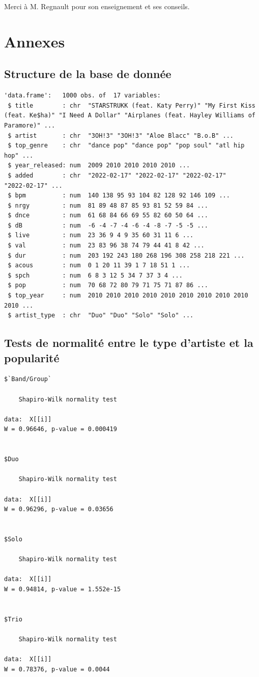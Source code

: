 \documentclass[french,]{compterendu}
\theoremstyle{urcastyle}
\theoremstyle{remark}
\begin{document}
Merci à M. Regnault pour son enseignement et ses conseils.

\hypertarget{appendix-annexes}{%
\appendix}


\hypertarget{annexes}{%
\section{Annexes}\label{annexes}}

\hypertarget{structure-de-la-base-de-donnuxe9e}{%
\subsection{Structure de la base de donnée}\label{structure-de-la-base-de-donnuxe9e}}

\begin{verbatim}
'data.frame':   1000 obs. of  17 variables:
 $ title        : chr  "STARSTRUKK (feat. Katy Perry)" "My First Kiss (feat. Ke$ha)" "I Need A Dollar" "Airplanes (feat. Hayley Williams of Paramore)" ...
 $ artist       : chr  "3OH!3" "3OH!3" "Aloe Blacc" "B.o.B" ...
 $ top_genre    : chr  "dance pop" "dance pop" "pop soul" "atl hip hop" ...
 $ year_released: num  2009 2010 2010 2010 2010 ...
 $ added        : chr  "2022‑02‑17" "2022‑02‑17" "2022‑02‑17" "2022‑02‑17" ...
 $ bpm          : num  140 138 95 93 104 82 128 92 146 109 ...
 $ nrgy         : num  81 89 48 87 85 93 81 52 59 84 ...
 $ dnce         : num  61 68 84 66 69 55 82 60 50 64 ...
 $ dB           : num  -6 -4 -7 -4 -6 -4 -8 -7 -5 -5 ...
 $ live         : num  23 36 9 4 9 35 60 31 11 6 ...
 $ val          : num  23 83 96 38 74 79 44 41 8 42 ...
 $ dur          : num  203 192 243 180 268 196 308 258 218 221 ...
 $ acous        : num  0 1 20 11 39 1 7 18 51 1 ...
 $ spch         : num  6 8 3 12 5 34 7 37 3 4 ...
 $ pop          : num  70 68 72 80 79 71 75 71 87 86 ...
 $ top_year     : num  2010 2010 2010 2010 2010 2010 2010 2010 2010 2010 ...
 $ artist_type  : chr  "Duo" "Duo" "Solo" "Solo" ...
\end{verbatim}

\hypertarget{TestNorm1}{%
\subsection{Tests de normalité entre le type d'artiste et la popularité}\label{TestNorm1}}

\begin{verbatim}
$`Band/Group`

    Shapiro-Wilk normality test

data:  X[[i]]
W = 0.96646, p-value = 0.000419


$Duo

    Shapiro-Wilk normality test

data:  X[[i]]
W = 0.96296, p-value = 0.03656


$Solo

    Shapiro-Wilk normality test

data:  X[[i]]
W = 0.94814, p-value = 1.552e-15


$Trio

    Shapiro-Wilk normality test

data:  X[[i]]
W = 0.78376, p-value = 0.0044
\end{verbatim}
\end{document}
